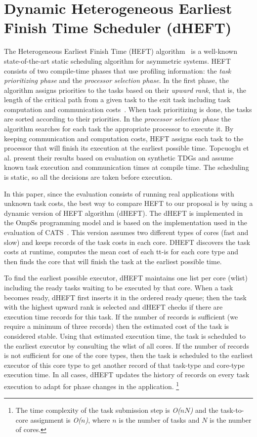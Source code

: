 \section{Dynamic Heterogeneous Earliest Finish Time Scheduler (dHEFT)}
\label{sec.scheduling.heft}
The Heterogeneous Earliest Finish Time (HEFT) algorithm~\cite{HEFT} is a well-known state-of-the-art static scheduling algorithm for asymmetric systems.
HEFT consists of two compile-time phases that use profiling information: the \textit{task prioritizing phase} and the \textit{processor selection phase}.
In the first phase, the algorithm assigns priorities to the tasks based on their \textit{upward rank}, that is, the length of the critical path from a given task to the exit task including task computation and communication costs~\cite{HEFT}.
When task prioritizing is done, the tasks are sorted according to their priorities.
In the \textit{processor selection phase} the algorithm searches for each task the appropriate processor to execute it.
By keeping communication and computation costs, HEFT assigns each task to the processor that will finish its execution at the earliest possible time.
Topcuoglu et al. \cite{HEFT} present their results based on evaluation on synthetic TDGs and assume known task execution and communication times at compile time.
The scheduling is static, so all the decisions are taken before execution.

In this paper, since the evaluation consists of running real applications with unknown task costs, the best way to compare HEFT to our proposal is by using a dynamic version of HEFT algorithm (dHEFT).
The dHEFT is implemented in the OmpSs programming model and is based on the implementation used in the evaluation of CATS~\cite{Chronaki:ICS2015}.
This version assumes two different types of cores (fast and slow) and keeps records of the task costs in each core.
DHEFT discovers the task costs at runtime, computes the mean cost of each tt-is for each core type and then finds the core that will finish the task at the earliest possible time.

To find the earliest possible executor, dHEFT maintains
one list per core (wlist) including the ready tasks waiting
to be executed by that core. 
When a task becomes ready, dHEFT first inserts it in the ordered ready queue; then the task with the highest upward rank is selected and dHEFT checks if there are execution time records for this task. 
If the number of records is sufficient (we require a minimum of three records)
then the estimated cost of the task is considered stable. 
Using that estimated execution time, the task
is scheduled to the earliest executor by consulting the wlist
of all cores. If the number of records is not sufficient
for one of the core types, then the task is scheduled to the
earliest executor of this core type to get another record of
that task-type and core-type execution time. In all cases,
dHEFT updates the history of records on every task execution to adapt for phase changes in the application. \footnote{The time complexity of the task submission step is \textit{O($nN$)} and the task-to-core assignment is \textit{O($n$)}, where \textit{$n$} is the number of tasks and \textit{$N$} is the number of cores.}

